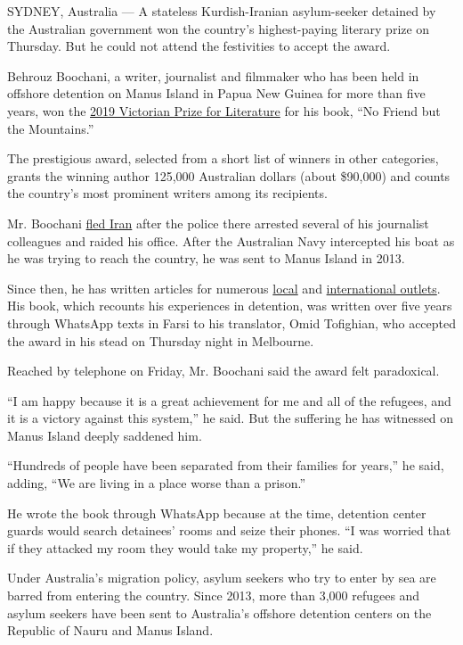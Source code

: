 SYDNEY, Australia --- A stateless Kurdish-Iranian asylum-seeker detained
by the Australian government won the country's highest-paying literary
prize on Thursday. But he could not attend the festivities to accept the
award.

Behrouz Boochani, a writer, journalist and filmmaker who has been held
in offshore detention on Manus Island in Papua New Guinea for more than
five years, won the
\href{https://www.wheelercentre.com/news/behrouz-boochani-wins-the-2019-victorian-prize-for-literature}{2019
Victorian Prize for Literature} for his book, ``No Friend but the
Mountains.''

The prestigious award, selected from a short list of winners in other
categories, grants the winning author 125,000 Australian dollars (about
\$90,000) and counts the country's most prominent writers among its
recipients.

Mr. Boochani
\href{https://www.nytimes.com/2017/02/13/insider/manus-island-refugee-australia.html}{fled
Iran} after the police there arrested several of his journalist
colleagues and raided his office. After the Australian Navy intercepted
his boat as he was trying to reach the country, he was sent to Manus
Island in 2013.

Since then, he has written articles for numerous
\href{https://www.thesaturdaypaper.com.au/contributor/behrouz-boochani}{local}
and
\href{https://www.theguardian.com/profile/behrouz-boochani}{international
outlets}. His book, which recounts his experiences in detention, was
written over five years through WhatsApp texts in Farsi to his
translator, Omid Tofighian, who accepted the award in his stead on
Thursday night in Melbourne.

Reached by telephone on Friday, Mr. Boochani said the award felt
paradoxical.

``I am happy because it is a great achievement for me and all of the
refugees, and it is a victory against this system,'' he said. But the
suffering he has witnessed on Manus Island deeply saddened him.

``Hundreds of people have been separated from their families for
years,'' he said, adding, ``We are living in a place worse than a
prison.''

He wrote the book through WhatsApp because at the time, detention center
guards would search detainees' rooms and seize their phones. ``I was
worried that if they attacked my room they would take my property,'' he
said.

Under Australia's migration policy, asylum seekers who try to enter by
sea are barred from entering the country. Since 2013, more than 3,000
refugees and asylum seekers have been sent to Australia's offshore
detention centers on the Republic of Nauru and Manus Island.

